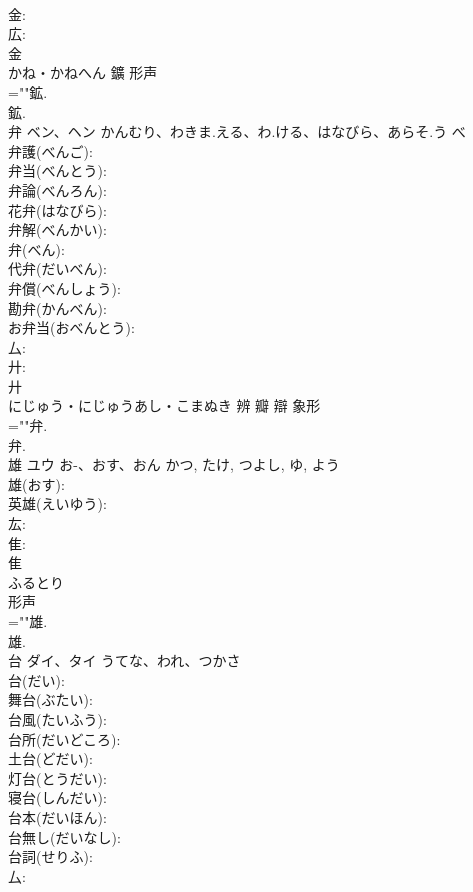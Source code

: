 \documentclass[8pt]{extreport}
\begin{document}
\begin{CJK}{UTF8}{min}
\\	金: 
\\	広: 
\\	金	
\\	かね・かねへん	鑛	形声 
\\	=""鉱.
\\	鉱.
\\	弁	ベン、ヘン	かんむり、わきま.える、わ.ける、はなびら、あらそ.う	べ	
\\	弁護(べんご): 
\\	弁当(べんとう): 
\\	弁論(べんろん): 
\\	花弁(はなびら): 
\\	弁解(べんかい): 
\\	弁(べん): 
\\	代弁(だいべん): 
\\	弁償(べんしょう): 
\\	勘弁(かんべん): 
\\	お弁当(おべんとう): 
\\	厶: 
\\	廾: 
\\	廾	
\\	にじゅう・にじゅうあし・こまぬき	辨 瓣 辯	象形 
\\	=""弁.
\\	弁.
\\	雄	ユウ	お-、おす、おん	かつ, たけ, つよし, ゆ, よう	
\\	雄(おす): 
\\	英雄(えいゆう): 
\\	厷: 
\\	隹: 
\\	隹	
\\	ふるとり	
\\	形声 
\\	=""雄.
\\	雄.
\\	台	ダイ、タイ	うてな、われ、つかさ		
\\	台(だい): 
\\	舞台(ぶたい): 
\\	台風(たいふう): 
\\	台所(だいどころ): 
\\	土台(どだい): 
\\	灯台(とうだい): 
\\	寝台(しんだい): 
\\	台本(だいほん): 
\\	台無し(だいなし): 
\\	台詞(せりふ): 
\\	厶: 

\end{CJK}
\end{document}

